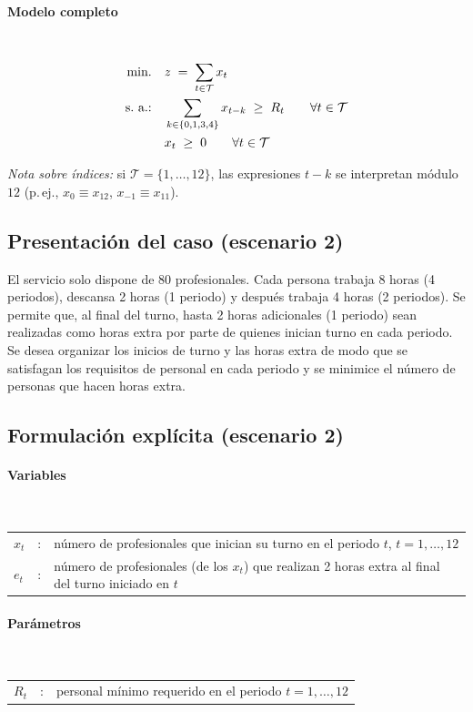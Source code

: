 \paragraph{Modelo completo}\mbox{}\\
\begin{align}
\mbox{min.}\quad & z \;=\; \sum_{t\in\mathcal{T}} x_t \notag \\
\mbox{s.\ a.:}\quad 
& \sum_{k\in\{0,1,3,4\}} x_{t-k} \;\ge\; R_t \qquad \forall t\in\mathcal{T} \notag \\
& x_t \;\ge\; 0 \qquad \forall t\in\mathcal{T} \notag
\end{align}

\medskip
\textit{Nota sobre índices:} si $\mathcal{T}=\{1,\dots,12\}$, las expresiones $t-k$ se interpretan módulo $12$ (p.\,ej., $x_{0}\equiv x_{12}$, $x_{-1}\equiv x_{11}$).


\subsection{Presentación del caso (escenario 2)}
El servicio solo dispone de 80 profesionales. Cada persona trabaja 8 horas (4 periodos), descansa 2 horas (1 periodo) y después trabaja 4 horas (2 periodos). Se permite que, al final del turno, hasta 2 horas adicionales (1 periodo) sean realizadas como horas extra por parte de quienes inician turno en cada periodo. Se desea organizar los inicios de turno y las horas extra de modo que se satisfagan los requisitos de personal en cada periodo y se minimice el número de personas que hacen horas extra.

\subsection{Formulación explícita (escenario 2)}

\paragraph{Variables}\mbox{}\\
\begin{tabular}{l c l}
    $x_t$ & : & número de profesionales que inician su turno en el periodo $t$, $t=1,\dots,12$\\
    $e_t$ & : & número de profesionales (de los $x_t$) que realizan 2 horas extra al final del turno iniciado en $t$\\
\end{tabular}

\paragraph{Parámetros}\mbox{}\\
\begin{tabular}{l c l}
    $R_t$ & : & personal mínimo requerido en el periodo $t=1,\dots,12$\\
\end{tabular}

